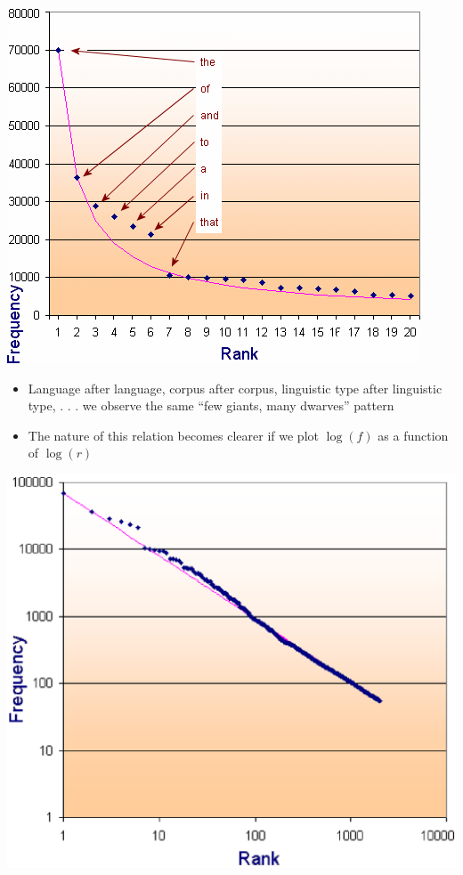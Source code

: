 \documentclass[a4paper,landscape,headrule,footrule,dvips]{foils}
\begin{document}
\begin{CJK}{UTF8}{min}
\vspace{2ex}\begin{center}
  \includegraphics[height=0.9\textheight]{include/bc-0}
\end{center}
\begin{itemize}
\item Language after language, corpus after corpus, linguistic
type after linguistic type, . . . we observe the same “few
giants, many dwarves” pattern
\item The nature of this relation becomes clearer if we plot $\log(f)$ as a
function of $\log(r)$
\end{itemize}

\newpage
\begin{center}
  \includegraphics[height=0.98\textheight]{include/bc-2}
\end{center}


\end{CJK}
\end{document}
